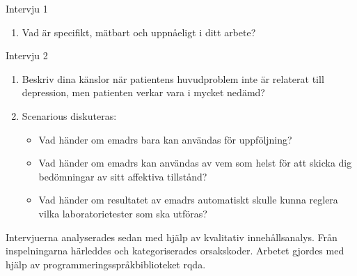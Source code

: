 \documentclass[12pt,a4paper,oneside]{article}
\let\oldcite\cite
\renewcommand*\cite[1]{\textsuperscript{\oldcite{#1}}}
\begin{document}
Intervju 1%
\begin{enumerate}[label=1.\arabic*.]
\item {\bf} Vad {\"a}r specifikt, m{\"a}tbart och uppn{\aa}eligt i ditt arbete?
\end{enumerate}
Intervju 2%
\begin{enumerate}[label=2.\arabic*.]
\item {\bf} Beskriv dina k{\"a}nslor n{\"a}r patientens huvudproblem inte {\"a}r relaterat till depression, men patienten verkar vara i mycket ned{\"a}md?
\item {\bf} Scenarious diskuteras:
\begin{itemize}\vspace{-.5em}
\item {\bf} Vad h{\"a}nder om e{\sc madrs} bara kan anv{\"a}ndas f{\"or} uppf{\"o}ljning?
\item {\bf} Vad h{\"a}nder om e{\sc madrs} kan anv{\"a}ndas av vem som helst f{\"o}r att skicka dig bed{\"o}mningar av sitt affektiva tillst{\aa}nd?
\item {\bf} Vad h{\"a}nder om resultatet av e{\sc madrs} automatiskt skulle kunna reglera vilka laboratorietester som ska utf{\"o}ras?
\end{itemize}
\end{enumerate}
Intervjuerna analyserades sedan med hj{\"a}lp av kvalitativ inneh{\aa}llsanalys\cite{analysis1}. Fr{\aa}n inspelningarna h{\"a}rleddes och kategoriserades orsakskoder. Arbetet gjordes med hj{\"a}lp av programmeringsspr{\aa}kbiblioteket {\sc rqda}\cite{rqda}.
\end{document}
